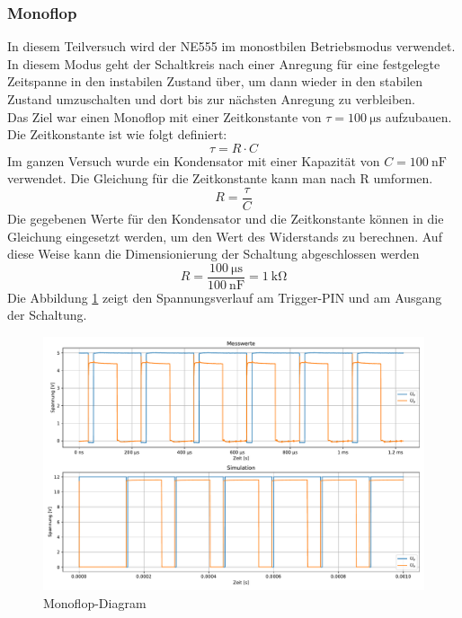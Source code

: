 \subsubsection{Monoflop}
%
In diesem Teilversuch wird der NE555 im monostbilen Betriebsmodus verwendet. In diesem Modus geht der Schaltkreis nach einer Anregung für eine festgelegte Zeitspanne in den instabilen Zustand über, um dann wieder in den stabilen Zustand umzuschalten und dort bis zur nächsten Anregung zu verbleiben.\\
Das Ziel war einen Monoflop mit einer Zeitkonstante von $\tau=\SI{100}{\micro\second}$ aufzubauen.
Die Zeitkonstante ist wie folgt definiert:
\begin{equation}
    \tau=R\cdot C
\end{equation}
Im ganzen Versuch wurde ein Kondensator mit einer Kapazität von $C=\SI{100}{\nano\farad}$ verwendet. Die Gleichung für die Zeitkonstante kann man nach R umformen.
\begin{equation*}
R=\frac{\tau}{C}
\end{equation*}
Die gegebenen Werte für den Kondensator und die Zeitkonstante können in die Gleichung eingesetzt werden, um den Wert des Widerstands zu berechnen. Auf diese Weise kann die Dimensionierung der Schaltung abgeschlossen werden
\begin{equation*}
R=\frac{\SI{100}{\micro\second}}{\SI{100}{\nano\farad}}=\SI{1}{\kilo\ohm}
\end{equation*}
%
Die Abbildung \ref{fig:monoflop} zeigt den Spannungsverlauf am Trigger-PIN und am Ausgang der Schaltung.
\begin{figure}[H]
  \centering
  \includegraphics[width=\linewidth]{Elektronik-Laborprotokoll_Filter/Plots/monoflop.pdf}
  \caption{Monoflop-Diagram}
  \label{fig:monoflop}
\end{figure}

